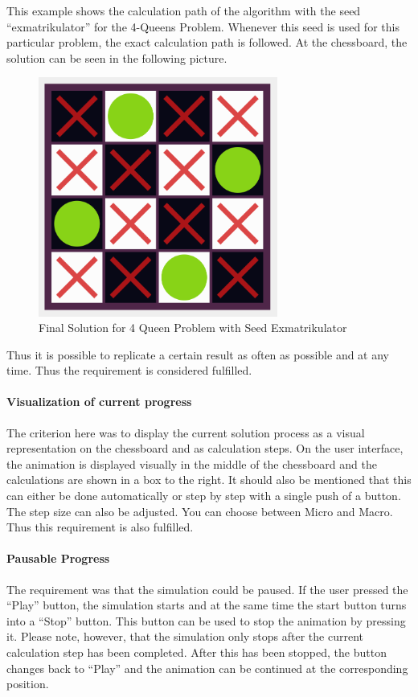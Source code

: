 This example shows the calculation path of the algorithm with the seed \enquote{exmatrikulator} for the 4-Queens Problem. Whenever this seed is used for this particular problem, the exact calculation path is followed. At the chessboard, the solution can be seen in the following picture.
\begin{figure}[H]
  \centering
  \includegraphics[width=0.7\textwidth]{img/Proof_Chessboard}
  \caption{Final Solution for 4 Queen Problem with Seed Exmatrikulator}
  \label{fig:design}
\end{figure} 
Thus it is possible to replicate a certain result as often as possible and at any time. Thus the requirement is considered fulfilled.
\paragraph{Visualization of current progress}
The criterion here was to display the current solution process as a visual representation on the chessboard and as calculation steps. On the user interface, the animation is displayed visually in the middle of the chessboard and the calculations are shown in a box to the right. It should also be mentioned that this can either be done automatically or step by step with a single push of a button. The step size can also be adjusted. You can choose between Micro and Macro. Thus this requirement is also fulfilled.
\paragraph{Pausable Progress}
The requirement was that the simulation could be paused. If the user pressed the \enquote{Play} button, the simulation starts and at the same time the start button turns into a \enquote{Stop} button. This button can be used to stop the animation by pressing it. Please note, however, that the simulation only stops after the current calculation step has been completed. After this has been stopped, the button changes back to \enquote{Play} and the animation can be continued at the corresponding position.
